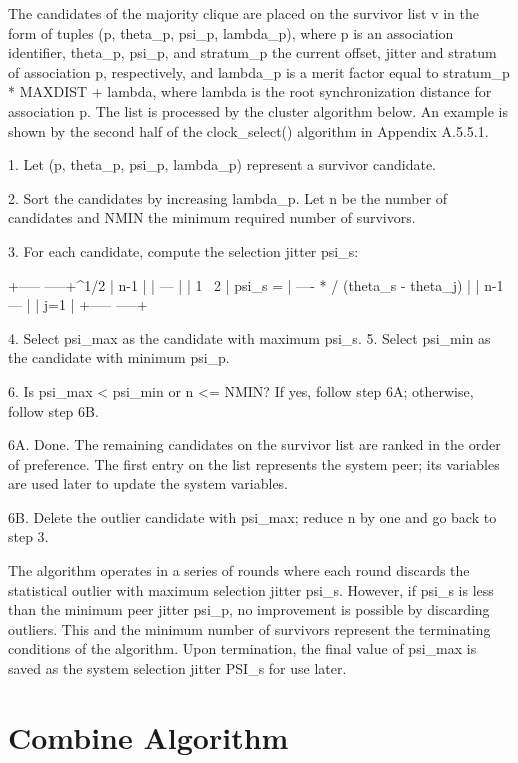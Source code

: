 The candidates of the majority clique are placed on the survivor list
v in the form of tuples (p, theta_p, psi_p, lambda_p), where p is an
association identifier, theta_p, psi_p, and stratum_p the current
offset, jitter and stratum of association p, respectively, and
lambda_p is a merit factor equal to stratum_p * MAXDIST + lambda,
where lambda is the root synchronization distance for association p.
The list is processed by the cluster algorithm below.  An example is
shown by the second half of the clock_select() algorithm in
Appendix A.5.5.1.

1.  Let (p, theta_p, psi_p, lambda_p) represent a survivor candidate.

2.  Sort the candidates by increasing lambda_p.  Let n be the number
of candidates and NMIN the minimum required number of survivors.

3.  For each candidate, compute the selection jitter psi_s:

          +-----                       -----+^1/2
          |        n-1                      |
          |        ---                      |
          |   1    \                     2  |
  psi_s = | ---- * /  (theta_s - theta_j)   |
          |  n-1   ---                      |
          |        j=1                      |
          +-----                       -----+

4.  Select psi_max as the candidate with maximum psi_s.
5.  Select psi_min as the candidate with minimum psi_p.

6.  Is psi_max < psi_min or n <= NMIN?  If yes, follow step 6A;
otherwise, follow step 6B.

6A. Done.  The remaining candidates on the survivor list are ranked
in the order of preference.  The first entry on the list represents
the system peer; its variables are used later to update the system
variables.

6B. Delete the outlier candidate with psi_max; reduce n by one and go
back to step 3.

The algorithm operates in a series of rounds where each round
discards the statistical outlier with maximum selection jitter psi_s.
However, if psi_s is less than the minimum peer jitter psi_p, no
improvement is possible by discarding outliers.  This and the minimum
number of survivors represent the terminating conditions of the
algorithm.  Upon termination, the final value of psi_max is saved as
the system selection jitter PSI_s for use later.

\section{Combine Algorithm}

